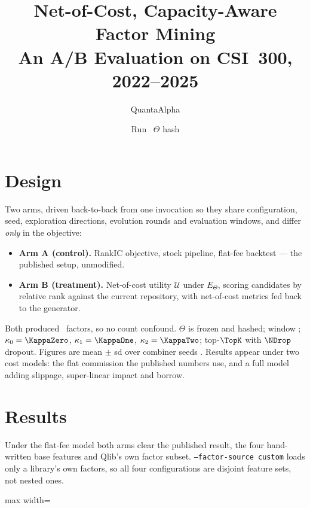 \documentclass[11pt,a4paper]{article}
\title{\vspace{-1.5em}\textbf{Net-of-Cost, Capacity-Aware Factor Mining}\\[0.2em]
       \large An A/B Evaluation on CSI~300, 2022--2025}
\author{QuantaAlpha}
\date{Run \RunStamp\ \quad $\Theta$ hash \texttt{\ThetaHash}}
\newcommand{\Etheta}{E_{\Theta}}
\newcommand{\util}{\mathcal{U}}
\begin{document}
\maketitle
\vspace{-1em}

\section{Design}

Two arms, driven back-to-back from one invocation so they share configuration,
seed, exploration directions, evolution rounds and evaluation windows, and
differ \emph{only} in the objective:

\begin{itemize}\itemsep1pt\parskip0pt
  \item \textbf{Arm A (control).} RankIC objective, stock pipeline, flat-fee
        backtest --- the published setup, unmodified.
  \item \textbf{Arm B (treatment).} Net-of-cost utility $\util$ under $\Etheta$,
        scoring candidates by relative rank against the current repository, with
        net-of-cost metrics fed back to the generator.
\end{itemize}

Both produced \NFactorsB\ factors, so no count confound. $\Theta$ is frozen and
hashed; window \EvalWindow; $\kappa_0=\KappaZero$, $\kappa_1=\KappaOne$,
$\kappa_2=\KappaTwo$; top-$\TopK$ with $\NDrop$ dropout. Figures are mean $\pm$
sd over combiner seeds \Seeds. Results appear under two cost models: the flat
commission the published numbers use, and a full model adding slippage,
super-linear impact and borrow.

\section{Results}

Under the flat-fee model both arms clear the published result, the four
hand-written base features and Qlib's own factor subset. \texttt{--factor-source
custom} loads only a library's own factors, so all four configurations are
disjoint feature sets, not nested ones.

\begin{table}[htbp]\centering
\caption{Out-of-sample, flat-fee cost model. All IC figures are computed on the
test split (see \S\ref{sec:defects}).}
\label{tab:headline}
\small\begin{adjustbox}{max width=\textwidth}\TblHeadline\end{adjustbox}
\end{table}
\end{document}
